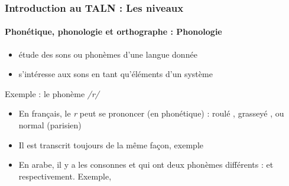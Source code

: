 \documentclass[xcolor=table]{beamer}
\begin{document}
\begin{frame}
\frametitle{Introduction au TALN : Les niveaux}
\framesubtitle{Phonétique, phonologie et orthographe : Phonologie}

\begin{itemize}
	\item étude des sons ou phonèmes d'une langue donnée
	\item s'intéresse aux sons en tant qu'éléments d'un système
\end{itemize}

\begin{exampleblock}{Exemple : le phonème \textit{/r/}}
	\begin{itemize}
		\item En français, le \textit{r} peut se prononcer (en phonétique) : roulé \expword{\textipa{[r]}}, grasseyé \expword{\textipa{[\;R]}}, ou normal (parisien) \expword{\textipa{[K]}}
		\item Il est transcrit toujours de la même façon, exemple 
		\item En arabe, il y a les consonnes  et  qui ont deux phonèmes différents :  et  respectivement. 
		Exemple, 
	\end{itemize}
\end{exampleblock}

\end{frame}
\end{document}
